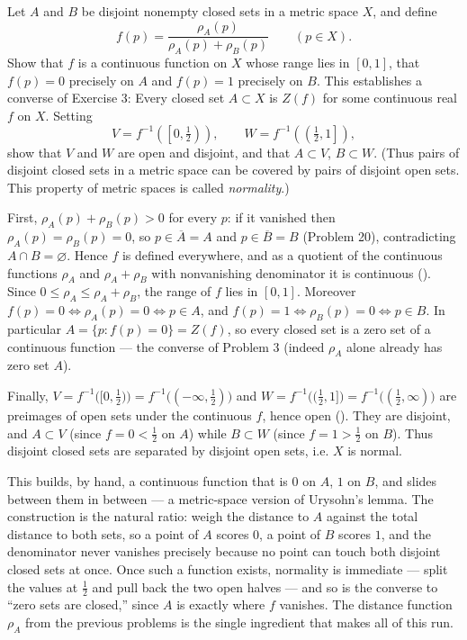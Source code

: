\documentclass[main.tex]{subfiles}
\begin{document}
Let $A$ and $B$ be disjoint nonempty closed sets in a metric space $X$, and define
\[
f(p) = \frac{\rho_{A}(p)}{\rho_{A}(p) + \rho_{B}(p)} \qquad (p \in X).
\]
Show that $f$ is a continuous function on $X$ whose range lies in $[0, 1]$, that $f(p) = 0$ precisely on $A$ and $f(p) = 1$ precisely on $B$. This establishes a converse of Exercise 3: Every closed set $A \subset X$ is $Z(f)$ for some continuous real $f$ on $X$. Setting
\[
V = f^{-1}\!\left(\left[0, \tfrac{1}{2}\right)\right), \qquad W = f^{-1}\!\left(\left(\tfrac{1}{2}, 1\right]\right),
\]
show that $V$ and $W$ are open and disjoint, and that $A \subset V$, $B \subset W$. (Thus pairs of disjoint closed sets in a metric space can be covered by pairs of disjoint open sets. This property of metric spaces is called \textit{normality}.)
\begin{SolutionBlue}
First, $\rho_{A}(p) + \rho_{B}(p) > 0$ for every $p$: if it vanished then $\rho_{A}(p) = \rho_{B}(p) = 0$, so $p \in \overline{A} = A$ and $p \in \overline{B} = B$ (Problem 20), contradicting $A \cap B = \varnothing$. Hence $f$ is defined everywhere, and as a quotient of the continuous functions $\rho_{A}$ and $\rho_{A} + \rho_{B}$ with nonvanishing denominator it is continuous (). Since $0 \le \rho_{A} \le \rho_{A} + \rho_{B}$, the range of $f$ lies in $[0, 1]$. Moreover $f(p) = 0 \iff \rho_{A}(p) = 0 \iff p \in A$, and $f(p) = 1 \iff \rho_{B}(p) = 0 \iff p \in B$. In particular $A = \{p : f(p) = 0\} = Z(f)$, so every closed set is a zero set of a continuous function --- the converse of Problem 3 (indeed $\rho_{A}$ alone already has zero set $A$).

Finally, $V = f^{-1}\big([0, \tfrac{1}{2})\big) = f^{-1}\big((-\infty, \tfrac{1}{2})\big)$ and $W = f^{-1}\big((\tfrac{1}{2}, 1]\big) = f^{-1}\big((\tfrac{1}{2}, \infty)\big)$ are preimages of open sets under the continuous $f$, hence open (). They are disjoint, and $A \subset V$ (since $f = 0 < \tfrac{1}{2}$ on $A$) while $B \subset W$ (since $f = 1 > \tfrac{1}{2}$ on $B$). Thus disjoint closed sets are separated by disjoint open sets, i.e. $X$ is normal.
\end{SolutionBlue}
\begin{Reflection}
This builds, by hand, a continuous function that is $0$ on $A$, $1$ on $B$, and slides between them in between --- a metric-space version of Urysohn's lemma. The construction is the natural ratio: weigh the distance to $A$ against the total distance to both sets, so a point of $A$ scores $0$, a point of $B$ scores $1$, and the denominator never vanishes precisely because no point can touch both disjoint closed sets at once. Once such a function exists, normality is immediate --- split the values at $\tfrac{1}{2}$ and pull back the two open halves --- and so is the converse to ``zero sets are closed,'' since $A$ is exactly where $f$ vanishes. The distance function $\rho_{A}$ from the previous problems is the single ingredient that makes all of this run.
\end{Reflection}
\end{document}

